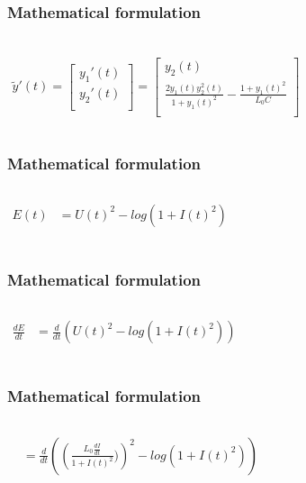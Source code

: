 \documentclass[aspectratio=1610]{beamer}
\begin{document}
\begin{frame}
\frametitle{Mathematical formulation}
\begin{columns}
\column{37em}
\huge
\begin{align*}\\
\tilde{y}'(t) =
\begin{bmatrix}
y_{1}'(t) \\ 
y_{2}'(t) \\
\end{bmatrix}
= \begin{bmatrix}
y_{2}(t)\\
\frac{2y_{1}(t)y_{2}^{2}(t)}{1+y_{1}(t)^2}-\frac{1+y_{1}(t)^{2}}{L_{0}C}\\
\end{bmatrix}
\end{align*}
\end{columns}
\end{frame}
\begin{frame}
\frametitle{Mathematical formulation}
\begin{columns}
\column{37em}
\huge
\begin{align*}
E(t) & = U(t)^{2}-log(1+I(t)^{2})\\
\end{align*}
\end{columns}
\end{frame}
\begin{frame}
\frametitle{Mathematical formulation}
\begin{columns}
\column{37em}
\huge
\begin{align*}
\frac{dE}{dt} & = \frac{d}{dt}\left(U(t)^{2}-log(1+I(t)^{2})\right)\\
\end{align*}
\end{columns}
\end{frame}
\begin{frame}
\frametitle{Mathematical formulation}
\begin{columns}
\column{37em}
\huge
\begin{align*}
& = \frac{d}{dt}\left(\left(\frac{L_{0}\frac{dI}{dt}}{1+I(t)^{2}})\right)^{2}-log\left(1+I(t)^{2}\right)\right) \\
\end{align*}
\end{columns}
\end{frame}
\end{document}
